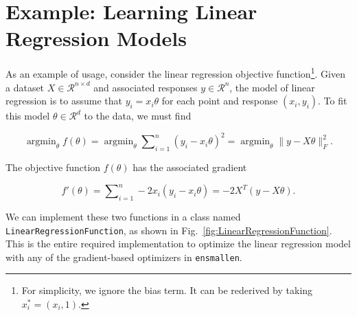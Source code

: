 \documentclass{article}
\DeclareMathOperator*{\argmindown}{argmin}   %
\begin{document}
\vspace*{-0.3em}
\section{Example: Learning Linear Regression Models}
\label{sec:linreg_example}
\vspace*{-0.5em}

As an example of usage, consider the linear regression objective
function\footnote{For simplicity, we ignore the bias term.  It can be
rederived by taking $x^*_i = (x_i, 1)$.}.  Given a dataset $X \in
\mathcal{R}^{n \times d}$ and associated responses $y \in \mathcal{R}^n$, the
model of linear regression is to assume that $y_i = x_i \theta$ for each
point and response $(x_i, y_i)$.  To fit this model $\theta \in \mathcal{R}^d$
to the data, we must find

\vspace*{-1.1em}
\begin{equation}
\argmindown_\theta f(\theta) =   %
\argmindown_\theta \sum\nolimits_{i = 1}^n (y_i - x_i \theta)^2 =
\argmindown_\theta \| y - X \theta \|_F^2.
\end{equation}
\vspace*{-1.1em}

The objective function $f(\theta)$ has the associated gradient

\vspace*{-1.1em}
\begin{equation}
f'(\theta) = \sum\nolimits_{i = 1}^n -2 x_i (y_i - x_i \theta) = -2 X^T (y - X \theta).
\end{equation}
\vspace*{-1.1em}

We can implement these two functions in a class named {\tt LinearRegressionFunction},
as shown in Fig.~\ref{fig:LinearRegressionFunction}.
This is the entire required implementation to optimize the linear regression model with
any of the gradient-based optimizers in {\tt ensmallen}.
\end{document}
